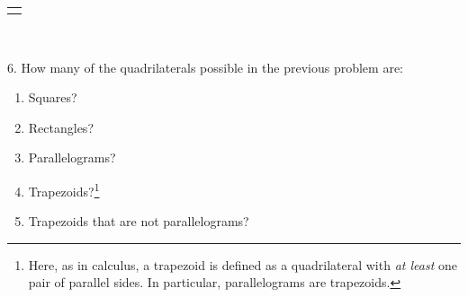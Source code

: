 \documentclass[12pt,]{book}
\theoremstyle{plain}
\theoremstyle{definition}
\theoremstyle{definition}
\theoremstyle{definition}
\numberwithin{equation}{chapter}
\newlength{\panelmax}
\begin{document}
\begin{exerciselist}
{%
\setlength{\panelmax}{0pt}
\ifdefined\panelboxAimage\else\newsavebox{\panelboxAimage}\fi%
\begin{lrbox}{\panelboxAimage}
\end{lrbox}
\ifdefined\phAimage\else\newlength{\phAimage}\fi%
\setlength{\phAimage}{\ht\panelboxAimage+\dp\panelboxAimage}
\settototalheight{\phAimage}{\usebox{\panelboxAimage}}
\setlength{\panelmax}{\maxof{\panelmax}{\phAimage}}
\leavevmode%
\setlength{\tabcolsep}{0\linewidth}
\par\medskip\noindent
\hspace*{0.23\linewidth}%
\begin{tabular}{@{}*{1}{c}@{}}
\begin{minipage}[c][\panelmax][t]{0.54\linewidth}\usebox{\panelboxAimage}\end{minipage}\end{tabular}\\
}%
\par\smallskip
\item[6.]\hypertarget{exercise-122}{}\hypertarget{p-979}{}%
How many of the quadrilaterals possible in the previous problem are: \leavevmode%
\begin{enumerate}[label=(\alph*)]
\item\hypertarget{li-452}{}\hypertarget{p-980}{}%
Squares?%
\item\hypertarget{li-453}{}\hypertarget{p-981}{}%
Rectangles?%
\item\hypertarget{li-454}{}\hypertarget{p-982}{}%
Parallelograms?%
\item\hypertarget{li-455}{}\hypertarget{p-983}{}%
Trapezoids?\footnote{Here, as in calculus, a trapezoid is defined as a quadrilateral with \emph{at least} one pair of parallel sides.  In particular, parallelograms are trapezoids.\label{fn-6}}%
\item\hypertarget{li-456}{}\hypertarget{p-984}{}%
Trapezoids that are not parallelograms?%
\end{enumerate}

\end{exerciselist}
\end{document}
